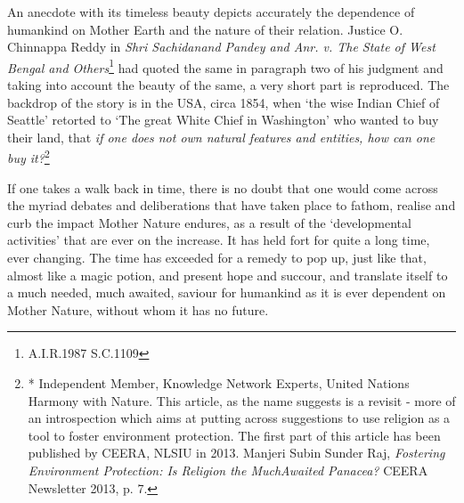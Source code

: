 \setcounter{figure}{0}
\setcounter{table}{0}
\setcounter{footnote}{0}

\label{2017-art2}

\begin{multicols}{2}


\vspace{-.15cm}

\noi
An anecdote with its timeless beauty depicts accurately the dependence of humankind on
Mother Earth and the nature of their relation. Justice O. Chinnappa Reddy in \textit{Shri Sachidanand
Pandey and Anr. v. The State of West Bengal and Others}\footnote{A.I.R.1987 S.C.1109} had quoted the same in paragraph two of his judgment and taking into account the beauty of the same, a very short part is reproduced. The backdrop of the story is in the USA, circa 1854, when ‘the wise Indian Chief of Seattle’ retorted to ‘The great White Chief in Washington’ who wanted to buy their land, that \textit{if one does not own natural features and entities, how can one buy it?}\footnote{* Independent Member, Knowledge Network Experts, United Nations Harmony with Nature. This article, as the name suggests is a revisit - more of an introspection which aims at putting across suggestions to use religion as a tool to foster environment protection. The first part of this article has been published by CEERA, NLSIU in 2013. Manjeri Subin Sunder Raj, \textit{Fostering Environment Protection: Is Religion the MuchAwaited Panacea?} CEERA Newsletter 2013, p. 7.}

\vspace{-.15cm}

\noi
If one takes a walk back in time, there is no doubt that one would come across the myriad
debates and deliberations that have taken place to fathom, realise and curb the impact Mother
Nature endures, as a result of the ‘developmental activities’ that are ever on the increase. It has
held fort for quite a long time, ever changing. The time has exceeded for a remedy to pop up,
just like that, almost like a magic potion, and present hope and succour, and translate itself to
a much needed, much awaited, saviour for humankind as it is ever dependent on Mother Nature,
without whom it has no future.


\end{multicols}
